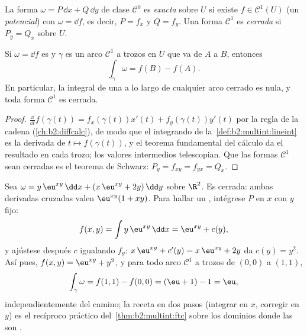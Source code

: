 \begin{definition}\label{def:b2:multint:exact}
La forma $\omega = P\,\dd x + Q\,\dd y$ de clase $\mathcal{C}^0$ es
\emph{exacta} sobre $U$ si existe $f \in
\mathcal{C}^1(U)$ (un \emph{potencial}) con $\omega
= \dd f$, es decir, $P = f_x$ y $Q = f_y$. Una forma $\mathcal{C}^1$
es \emph{cerrada} si $P_y = Q_x$ sobre $U$.
\end{definition}

\begin{theorem}\label{thm:b2:multint:ftc}
Si $\omega = \dd f$ es  y $\gamma$ es un arco $\mathcal{C}^1$ a
trozos en $U$ que va de $A$ a $B$, entonces
\[
\int_\gamma \omega = f(B) - f(A) .
\]
En particular, la integral de una  a lo largo de
cualquier arco cerrado es nula, y toda forma $\mathcal{C}^1$
 es cerrada.
\end{theorem}

\begin{proof}
$\frac{\dd}{\dd t}f(\gamma(t)) = f_x(\gamma(t))x'(t) +
f_y(\gamma(t))y'(t)$ por la regla de la cadena
(\cref{ch:b2:diffcalc}), de modo que el integrando de la~\cref{def:b2:multint:lineint} es la derivada de $t \mapsto
f(\gamma(t))$, y el teorema fundamental del cálculo da el resultado
en cada trozo; los valores intermedios telescopian. Que las formas
$\mathcal{C}^1$  sean cerradas es el teorema de Schwarz: $P_y
= f_{xy} = f_{yx} = Q_x$.
\end{proof}

\begin{example}\label{ex:b2:multint:potential}
Sea $\omega = y\,\eu^{xy}\,\dd x + (x\,\eu^{xy} + 2y)\,\dd y$ sobre
$\R^2$. Es cerrada: ambas derivadas cruzadas valen $\eu^{xy}(1 +
xy)$. Para hallar un , intégrese $P$ en $x$ con $y$ fijo:
\[
f(x, y) = \int y\,\eu^{xy}\,\dd x = \eu^{xy} + c(y),
\]
y ajústese después $c$ igualando $f_y$: $x\,\eu^{xy} + c'(y) =
x\,\eu^{xy} + 2y$ da $c(y) = y^2$. Así pues, $f(x,y) = \eu^{xy} +
y^2$, y para todo arco $\mathcal C^1$ a trozos de $(0,0)$ a $(1,1)$,
\[
\int_\gamma\omega = f(1,1) - f(0,0) = (\eu + 1) - 1 = \eu ,
\]
independientemente del camino; la receta en dos pasos (integrar en
$x$, corregir en $y$) es el recíproco práctico del~\cref{thm:b2:multint:ftc} sobre los dominios donde las
 son .
\end{example}

